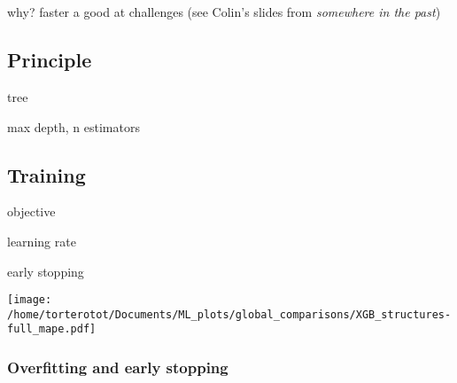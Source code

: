 \section{\XGBOOST}\label{chapter-ML-section-XGB}
why? faster a good at challenges (see Colin's slides from \emph{somewhere in the past})
\subsection{Principle}
tree

max depth, n estimators

\subsection{Training}

objective

learning rate

early stopping

\texttt{[image: /home/torterotot/Documents/ML\_plots/global\_comparisons/XGB\_structures-full\_mape.pdf]}



\subsubsection{Overfitting and early stopping}




